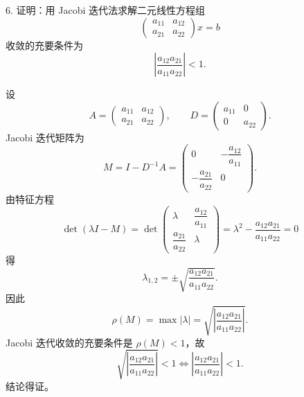 \documentclass[11pt, a4paper]{ctexart}
\begin{document}
\begin{problem}{6. 证明：用 Jacobi 迭代法求解二元线性方程组}
    \[
        \begin{pmatrix}
            a_{11} & a_{12} \\
            a_{21} & a_{22}
        \end{pmatrix}
        x = b
    \]
    收敛的充要条件为
    \[
        \left| \frac{a_{12}a_{21}}{a_{11}a_{22}} \right| < 1.
    \]
\end{problem}

\begin{myproof}
    设
    \[
        A =
        \begin{pmatrix}
            a_{11} & a_{12} \\
            a_{21} & a_{22}
        \end{pmatrix},
        \qquad
        D =
        \begin{pmatrix}
            a_{11} & 0 \\
            0 & a_{22}
        \end{pmatrix}.
    \]
    Jacobi 迭代矩阵为
    \[
        M = I - D^{-1}A
        =
        \begin{pmatrix}
            0 & -\dfrac{a_{12}}{a_{11}} \\
            -\dfrac{a_{21}}{a_{22}} & 0
        \end{pmatrix}.
    \]
    由特征方程
    \[
        \det(\lambda I - M)
        =
        \det
        \begin{pmatrix}
            \lambda & \dfrac{a_{12}}{a_{11}} \\
            \dfrac{a_{21}}{a_{22}} & \lambda
        \end{pmatrix}
        = \lambda^2 - \frac{a_{12}a_{21}}{a_{11}a_{22}}
        = 0
    \]
    得
    \[
        \lambda_{1,2}
        = \pm \sqrt{\frac{a_{12}a_{21}}{a_{11}a_{22}}}.
    \]
    因此
    \[
        \rho(M)
        = \max |\lambda|
        = \sqrt{\left| \frac{a_{12}a_{21}}{a_{11}a_{22}} \right|}.
    \]
    Jacobi 迭代收敛的充要条件是 $\rho(M) < 1$，故
    \[
        \sqrt{\left| \frac{a_{12}a_{21}}{a_{11}a_{22}} \right|} < 1
        \iff
        \left| \frac{a_{12}a_{21}}{a_{11}a_{22}} \right| < 1.
    \]
    结论得证。
\end{myproof}
\end{document}
